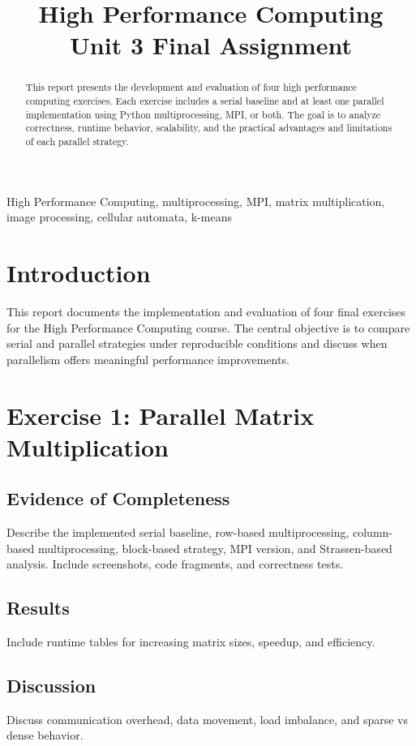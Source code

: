 \documentclass[conference]{IEEEtran}
\title{High Performance Computing\\
Unit 3 Final Assignment}
\author{\IEEEauthorblockN{Gael Alberto Lara Pe\~na}
\IEEEauthorblockA{Universidad Polit\'ecnica de Yucat\'an\\
Data Engineering}}
\begin{document}
\maketitle

\begin{abstract}
This report presents the development and evaluation of four high performance computing exercises. Each exercise includes a serial baseline and at least one parallel implementation using Python multiprocessing, MPI, or both. The goal is to analyze correctness, runtime behavior, scalability, and the practical advantages and limitations of each parallel strategy.
\end{abstract}

\begin{IEEEkeywords}
High Performance Computing, multiprocessing, MPI, matrix multiplication, image processing, cellular automata, k-means
\end{IEEEkeywords}

\section{Introduction}
This report documents the implementation and evaluation of four final exercises for the High Performance Computing course. The central objective is to compare serial and parallel strategies under reproducible conditions and discuss when parallelism offers meaningful performance improvements.

\section{Exercise 1: Parallel Matrix Multiplication}
\subsection{Evidence of Completeness}
Describe the implemented serial baseline, row-based multiprocessing, column-based multiprocessing, block-based strategy, MPI version, and Strassen-based analysis. Include screenshots, code fragments, and correctness tests.

\subsection{Results}
Include runtime tables for increasing matrix sizes, speedup, and efficiency.

\subsection{Discussion}
Discuss communication overhead, data movement, load imbalance, and sparse vs dense behavior.
\end{document}
